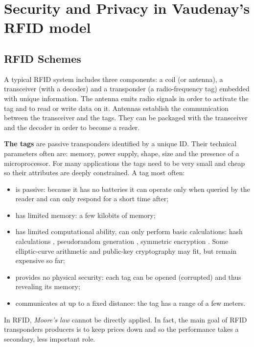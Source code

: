 \chapter{Security and Privacy in Vaudenay's RFID model}

\section{RFID Schemes}

        A typical RFID system includes three components: a coil (or antenna), a transceiver (with a decoder) and a
    transponder (a radio-frequency tag) embedded with unique information. The antenna emits radio signals in order to activate the tag and 
    to read or write data on it. Antennas establish the communication between the transceiver and the tags. They can be packaged with 
    the transceiver and the decoder in order to become a reader. 

        \textbf{The tags} are passive transponders identified by a unique ID. Their technical parameters often are: memory, power supply, shape, size and the presence of a 
    microprocessor. For many applications the tags need to be very small and cheap so their attributes are deeply constrained. A tag most often:
    \begin{itemize}
        \item is passive: because it has no batteries it can operate only when queried by the reader and can only respond for a short time after;
        \item has limited memory: a few kilobits of memory;
        \item has limited computational ability, can only perform basic calculations: hash calculations \cite{Feldhofer}, pseudorandom generation \cite{Robshaw}, 
        symmetric encryption \cite{Feldhofer2}. Some elliptic-curve arithmetic and public-key cryptography may fit, but remain expensive so far;
        \item provides no physical security: each tag can be opened (corrupted) and thus revealing its memory;
        \item communicates at up to a fixed distance: the tag has a range of a few meters.
    \end{itemize}
    
    In RFID, \textit{Moore's law} cannot be directly applied. In fact, the main goal of RFID transponders producers is to keep prices down and so the performance takes
    a secondary, less important role.

